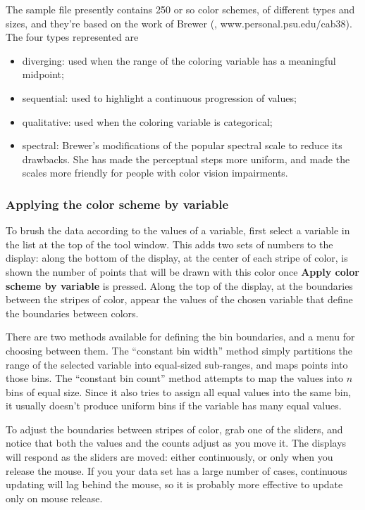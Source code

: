 \documentclass[11pt]{article}
\begin{document}
The sample file presently contains 250 or so color schemes, of
different types and sizes, and they're based on the work of
Brewer (\cite{Brewer99}, www.personal.psu.edu/cab38).
The four types represented are

\begin{itemize}
\item diverging: used when the range of the coloring variable has
      a meaningful midpoint;
\item sequential: used to highlight a continuous progression of values;
\item qualitative: used when the coloring variable is categorical;
\item spectral: Brewer's modifications of the popular spectral scale
      to reduce its drawbacks.  She has made the perceptual steps
      more uniform, and made the scales more friendly for people with
      color vision impairments.
\end{itemize}

\subsubsection{Applying the color scheme by variable}

To brush the data according to the values of a variable, first select
a variable in the list at the top of the tool window.  This adds two
sets of numbers to the display:  along the bottom of the display, at
the center of each stripe of color, is shown the number of points that
will be drawn with this color once {\bf Apply color scheme by variable}
is pressed.  Along the top of the display, at the boundaries between the
stripes of color, appear the values of the chosen variable that define
the boundaries between colors. 

There are two methods available for defining the bin boundaries, and
a menu for choosing between them.  The ``constant bin width'' method
simply partitions the range of the selected variable into equal-sized
sub-ranges, and maps points into those bins.  The ``constant bin
count'' method attempts to map the values into $n$ bins of equal
size.  Since it also tries to assign all equal values into the same
bin, it usually doesn't produce uniform bins if the variable has many
equal values.

To adjust the boundaries between stripes of color, grab one of the
sliders, and notice that both the values and the counts adjust as you
move it.  The displays will respond as the sliders are moved:  either
continuously, or only when you release the mouse.  If you your data set
has a large number of cases, continuous updating will lag behind the
mouse, so it is probably more effective to update only on mouse release.
\end{document}
